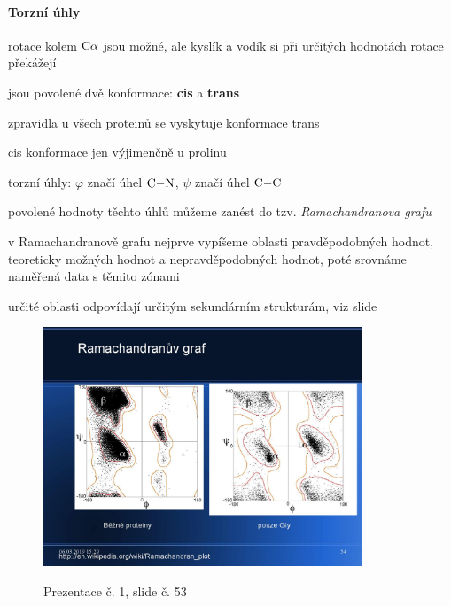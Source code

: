 \documentclass[DIV=8]{scrreprt}
\begin{document}
\paragraph{Torzní úhly}
\begin{myItemize}[nosep]
    \item rotace kolem \(\ce{C\alpha}\) jsou možné, ale kyslík a vodík si při určitých hodnotách rotace překážejí
    \item jsou povolené dvě konformace: \textbf{cis} a \textbf{trans}
\begin{myItemize}[nosep]
    \item zpravidla u všech proteinů se vyskytuje konformace trans
    \item cis konformace jen výjimenčně u prolinu
\end{myItemize}

    \item torzní úhly: \(\varphi\) značí úhel \(\ce{C-N}\), \(\psi\) značí úhel \(\ce{C-C}\)
\begin{myItemize}[nosep]
    \item povolené hodnoty těchto úhlů můžeme zanést do tzv. \emph{Ramachandranova grafu}
    \item v Ramachandranově grafu nejprve vypíšeme oblasti pravděpodobných hodnot, teoreticky možných hodnot a nepravděpodobných hodnot, poté srovnáme naměřená data s těmito zónami
    \item určité oblasti odpovídají určitým sekundárním strukturám, viz slide \begin{figure}
    \caption{Prezentace č. 1, slide č. 53}
    \includegraphics[width=0.85\textwidth]{slides-1/slide-53.jpg}
    \centering
    \label{slides-1-slide-53}
\end{figure}

\end{myItemize}

\end{myItemize}
\end{document}
